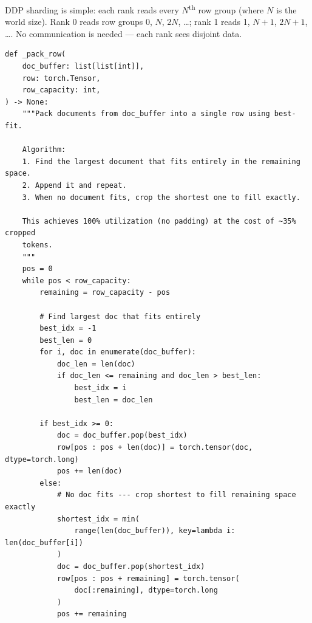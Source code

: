 DDP sharding is simple: each rank reads every $N$\textsuperscript{th} row group (where $N$ is the world size).  Rank 0 reads row groups 0, $N$, $2N$, \ldots; rank 1 reads 1, $N+1$, $2N+1$, \ldots.  No communication is needed --- each rank sees disjoint data.

\begin{lstlisting}
def _pack_row(
    doc_buffer: list[list[int]],
    row: torch.Tensor,
    row_capacity: int,
) -> None:
    """Pack documents from doc_buffer into a single row using best-fit.

    Algorithm:
    1. Find the largest document that fits entirely in the remaining space.
    2. Append it and repeat.
    3. When no document fits, crop the shortest one to fill exactly.

    This achieves 100% utilization (no padding) at the cost of ~35% cropped
    tokens.
    """
    pos = 0
    while pos < row_capacity:
        remaining = row_capacity - pos

        # Find largest doc that fits entirely
        best_idx = -1
        best_len = 0
        for i, doc in enumerate(doc_buffer):
            doc_len = len(doc)
            if doc_len <= remaining and doc_len > best_len:
                best_idx = i
                best_len = doc_len

        if best_idx >= 0:
            doc = doc_buffer.pop(best_idx)
            row[pos : pos + len(doc)] = torch.tensor(doc, dtype=torch.long)
            pos += len(doc)
        else:
            # No doc fits --- crop shortest to fill remaining space exactly
            shortest_idx = min(
                range(len(doc_buffer)), key=lambda i: len(doc_buffer[i])
            )
            doc = doc_buffer.pop(shortest_idx)
            row[pos : pos + remaining] = torch.tensor(
                doc[:remaining], dtype=torch.long
            )
            pos += remaining
\end{lstlisting}

